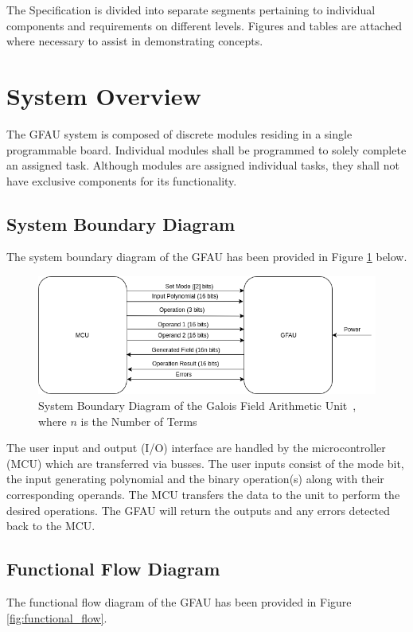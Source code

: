 \documentclass[paper=usletter, fontsize=14pt]{article}
\newcommand{\team}{Galois Field Arithmetic Unit}
\begin{document}
        The Specification is divided into separate segments pertaining to individual components and requirements on different levels. Figures and tables are attached where necessary to assist in demonstrating concepts.

        \section{System Overview}
        The GFAU system is composed of discrete modules residing in a single programmable board. Individual modules shall be programmed to solely complete an assigned task. Although modules are assigned individual tasks, they shall not have exclusive components for its functionality.

        \subsection{System Boundary Diagram}
        The system boundary diagram of the GFAU has been provided in Figure \ref{fig:system_boundary} below.

        \begin{figure}[ht]
            \begin{center}
                \includegraphics[width=1\textwidth]{system_boundary.png}
                \caption{System Boundary Diagram of the \team~, where $n$ is the Number of Terms} \label{fig:system_boundary}
            \end{center}
        \end{figure}

        The user input and output (I/O) interface are handled by the microcontroller (MCU) which are transferred via busses. The user inputs consist of the mode bit, the input generating polynomial and the binary operation(s) along with their corresponding operands. The MCU transfers the data to the unit to perform the desired operations. The GFAU will return the outputs and any errors detected back to the MCU.
        \newpage

        \subsection{Functional Flow Diagram}
        The functional flow diagram of the GFAU has been provided in Figure \ref{fig:functional_flow}.
\end{document}
